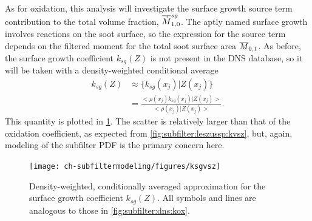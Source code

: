 

As for oxidation, this analysis will investigate the surface growth source term contribution to the total volume fraction, $\fst[M]{1,0}^{sg}$. The aptly named surface growth involves reactions on the soot surface, so the expression for the source term depends on the filtered moment for the total soot surface area $\mean{M}_{0,1}$. As before, the surface growth coefficient $k_{sg}(Z)$ is not present in the DNS database, so it will be taken with a density-weighted conditional average
\begin{equation}\label{eq:subfilter:dns:condksg}
  \begin{split}
    k_{sg}(Z) &\approx \{ k_{sg}(x_j)|Z(x_j) \} \\
    &= \frac{<\rho(x_j)k_{sg}(x_j)|Z(x_j)>}{<\rho(x_j)|Z(x_j)>}.
  \end{split}
\end{equation}
This quantity is plotted in \cref{fig:subfilter:dns:ksg}. The scatter is relatively larger than that of the oxidation coefficient, as expected from \cref{fig:subfilter:leszussp:kvsz}, but, again, modeling of the subfilter PDF is the primary concern here.


\begin{figure}[htb]
  \centering
  \texttt{[image: ch-subfiltermodeling/figures/ksgvsz]}
  \caption[Approximation for Surface Growth Coefficient, $k_{sg}(Z)$]{Density-weighted, conditionally averaged approximation for the surface growth coefficient $k_{sg}(Z)$. All symbols and lines are analogous to those in \cref{fig:subfilter:dns:kox}.}
  \label{fig:subfilter:dns:ksg}
\end{figure}

